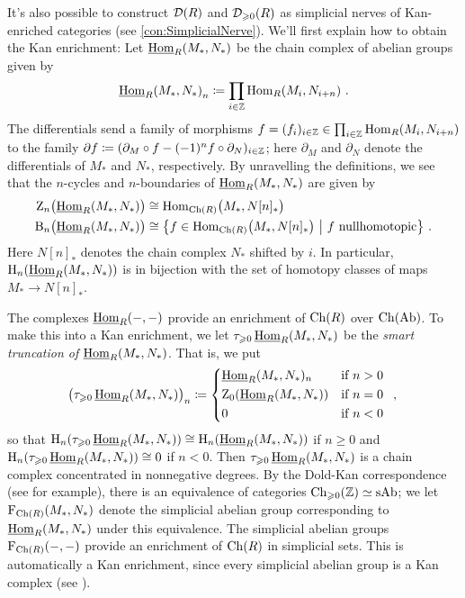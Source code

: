 \begin{numpar}\label{con:DerivedCategoryIII}
	It's also possible to construct $\mathcal{D}(R)$ and $\mathcal{D}_{\geqslant 0}(R)$ as simplicial nerves of Kan-enriched categories (see \cref{con:SimplicialNerve}). We'll first explain how to obtain the Kan enrichment: Let $\operatorname{\underline{Hom}}_R(M_*,N_*)$ be the chain complex of abelian groups given by 
	\begin{equation*}
		\operatorname{\underline{Hom}}_R\!\left(M_*,N_*\right)_n\coloneqq\prod_{i\in\mathbb{Z}}\operatorname{Hom}_R\!\left(M_i,N_{i+n}\right)\,.
	\end{equation*}
	The differentials send a family of morphisms $f=(f_i)_{i\in\mathbb{Z}}\in\prod_{i\in\mathbb{Z}}\operatorname{Hom}_R(M_i,N_{i+n})$ to the family $\partial f\coloneqq(\partial_M\circ f-(-1)^nf\circ \partial_N)_{i\in\mathbb{Z}}$; here $\partial_M$ and $\partial_N$ denote the differentials of $M_*$ and $N_*$, respectively. By unravelling the definitions, we see that the $n$-cycles and $n$-boundaries of $\operatorname{\underline{Hom}}_R(M_*,N_*)$ are given by
	\begin{align*}
		\mathrm Z_n\lef(\Hhom_R(M_*,N_*)\righ)&\cong \Hom_{\Ch(R)}\lef(M_*,N[n]_*\righ)\\
		\mathrm B_n\lef(\Hhom_R(M_*,N_*)\righ)&\cong \left\{f\in\Hom_{\Ch(R)}\lef(M_*,N[n]_*\righ)\ \middle|\ f\text{ nullhomotopic}\right\}\,.
	\end{align*}
	Here $N[n]_*$ denotes the chain complex $N_*$ shifted by $i$. In particular, $\H_n\lef(\Hhom_R(M_*,N_*)\righ)$ is in bijection with the set of homotopy classes of maps $M_*\rightarrow N[n]_*$.
	
	The complexes $\operatorname{\underline{Hom}}_R(-,-)$ provide an enrichment of $\operatorname{Ch}(R)$ over $\operatorname{Ch}(\mathrm{
		Ab})$. To make this into a Kan enrichment, we let $\tau_{\geqslant 0}\operatorname{\underline{Hom}}_R(M_*,N_*)$ be the \emph{smart truncation of $\operatorname{\underline{Hom}}_R(M_*,N_*)$}. That is, we put
	\begin{equation*}
		\lef(\tau_{\geqslant 0}\Hhom_R(M_*,N_*)\righ)_n\coloneqq \begin{cases*}
			\Hhom_R(M_*,N_*)_n & if $n>0$\\
			\mathrm Z_0\lef(\Hhom_R(M_*,N_*)\righ) & if $n=0$\\
			0 & if $n<0$
		\end{cases*}\,,
	\end{equation*}
	so that $\H_n\lef(\tau_{\geqslant 0}\Hhom_R(M_*,N_*)\righ)\cong \H_n\lef(\Hhom_R(M_*,N_*)\righ)$ if $n\geqslant 0$ and $\H_n\lef(\tau_{\geqslant 0}\Hhom_R(M_*,N_*)\righ)\cong0$ if $n<0$. Then $\tau_{\geqslant 0}\operatorname{\underline{Hom}}_R(M_*,N_*)$ is a chain complex concentrated in nonnegative degrees. By the Dold-Kan correspondence (see \cite[Theorem~]{HA} for example), there is an equivalence of categories $\operatorname{Ch}_{\geqslant 0}(\mathbb{Z})\simeq \mathrm{sAb}$; we let $\operatorname{F}_{\operatorname{Ch}(R)}(M_*,N_*)$ denote the simplicial abelian group corresponding to $\operatorname{\underline{Hom}}_R(M_*,N_*)$ under this equivalence. The simplicial abelian groups $\operatorname{F}_{\operatorname{Ch}(R)}(-,-)$ provide an enrichment of $\operatorname{Ch}(R)$ in simplicial sets. This is automatically a Kan enrichment, since every simplicial abelian group is a Kan complex (see \cite[]{Stacks}).
	

\end{numpar}
